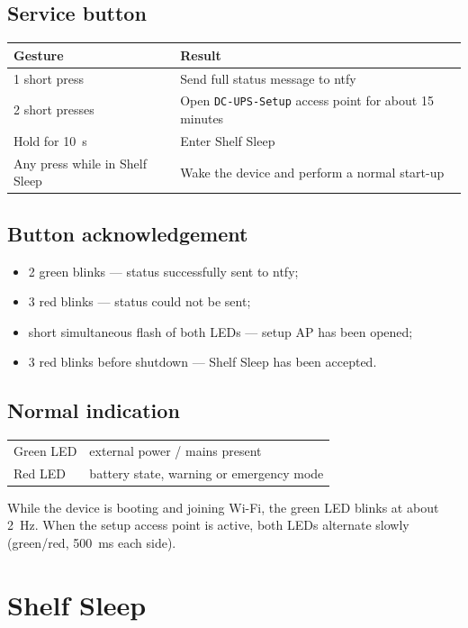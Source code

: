 \documentclass[10.5pt,a5paper]{article}
\begin{document}
\subsection{Service button}
\begin{tabularx}{\textwidth}{@{}p{40mm}X@{}}
\toprule
\textbf{Gesture} & \textbf{Result} \\
\midrule
1 short press & Send full status message to ntfy \\
2 short presses & Open \texttt{DC-UPS-Setup} access point for about 15 minutes \\
Hold for 10~s & Enter Shelf Sleep \\
Any press while in Shelf Sleep & Wake the device and perform a normal start-up \\
\bottomrule
\end{tabularx}

\subsection{Button acknowledgement}
\begin{itemize}
  \item 2 green blinks --- status successfully sent to ntfy;
  \item 3 red blinks --- status could not be sent;
  \item short simultaneous flash of both LEDs --- setup AP has been opened;
  \item 3 red blinks before shutdown --- Shelf Sleep has been accepted.
\end{itemize}

\subsection{Normal indication}
\begin{tabularx}{\textwidth}{@{}p{35mm}X@{}}
\toprule
Green LED & external power / mains present \\
Red LED & battery state, warning or emergency mode \\
\bottomrule
\end{tabularx}

While the device is booting and joining Wi-Fi, the green LED blinks at about 2~Hz. When the setup access point is active, both LEDs alternate slowly (green/red, 500~ms each side).

\section{Shelf Sleep}
\end{document}
